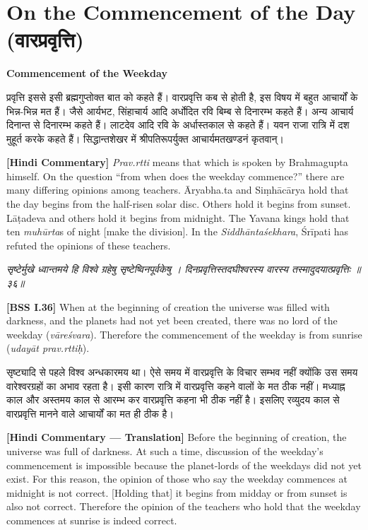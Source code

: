 \documentclass[11pt,a4paper]{book}
\newcommand{\dev}[1]{{\devanagarifont #1}}
\newcommand{\shlokabilingual}[2]{%
  \par\vspace{0.8em}%
  \noindent\begin{minipage}[t]{0.48\textwidth}
    \RaggedRight
    \dev{\textit{#1}}
  \end{minipage}%
  \hfill
  \begin{minipage}[t]{0.48\textwidth}
    \RaggedRight
    #2%
  \end{minipage}%
  \par\vspace{0.8em}%
}
\newcommand{\hindicommbilingual}[2]{%
  \par\vspace{0.5em}%
  \noindent\begin{minipage}[t]{0.48\textwidth}
    \RaggedRight\small
    \dev{#1}
  \end{minipage}%
  \hfill
  \begin{minipage}[t]{0.48\textwidth}
    \RaggedRight\small
    #2%
  \end{minipage}%
  \par\vspace{0.5em}%
}
\newcommand{\ruleheadingbilingual}[2]{%
  \par\vspace{0.8em}%
  \noindent\begin{minipage}[t]{0.48\textwidth}
    \textbf{\color{sectioncolor}\dev{#1}}
  \end{minipage}%
  \hfill
  \begin{minipage}[t]{0.48\textwidth}
    \textbf{\color{sectioncolor}#2}
  \end{minipage}%
  \par\vspace{0.4em}%
}
\begin{document}
\section{On the Commencement of the Day (\dev{वारप्रवृत्ति})}

\ruleheadingbilingual{प्रवृत्तिवाद}{Commencement of the Weekday}

\hindicommbilingual{%
\dev{प्रवृत्ति} इससे इसी ब्रह्मगुप्तोक्त बात को कहते हैं। वारप्रवृत्ति कब से होती है, इस विषय में बहुत आचार्यों के भिन्न-भिन्न मत हैं। जैसे आर्यभट, सिंहाचार्य आदि अर्धोदित रवि बिम्ब से दिनारम्भ कहते हैं। अन्य आचार्य दिनान्त से दिनारम्भ कहते हैं। लाटदेव आदि रवि के अर्धास्तकाल से कहते हैं। यवन राजा रात्रि में दश मुहूर्त करके कहते हैं। सिद्धान्तशेखर में श्रीपतिरूपर्युक्त आचार्यमतखण्डनं कृतवान्‌।
}{%
\textbf{[Hindi Commentary]} \textit{Prav.rtti} means that which is spoken by Brahmagupta himself. On the question ``from when does the weekday commence?'' there are many differing opinions among teachers. Āryabha.ta and Siṃhācārya hold that the day begins from the half-risen solar disc. Others hold it begins from sunset. Lāṭadeva and others hold it begins from midnight. The Yavana kings hold that ten \textit{muhūrta}s of night [make the division]. In the \textit{Siddhāntaśekhara}, Śrīpati has refuted the opinions of these teachers.
}

\shlokabilingual{%
सृष्टेर्मुखे ध्वान्तमये हि विश्वे ग्रहेषु सृष्टेष्विनपूर्वकेषु ।
दिनप्रवृत्तिस्तदघीश्वरस्य वारस्य तस्मादुदयात्प्रवृत्तिः ॥३६॥
}{%
\textbf{[BSS I.36]} When at the beginning of creation the universe was filled with darkness, and the planets had not yet been created, there was no lord of the weekday (\textit{vāreśvara}). Therefore the commencement of the weekday is from sunrise (\textit{udayāt prav.rttiḥ}).
}

\hindicommbilingual{%
सृष्ट्यादि से पहले विश्व अन्धकारमय था। ऐसे समय में वारप्रवृत्ति के विचार सम्भव नहीं क्योंकि उस समय वारेश्वरग्रहों का अभाव रहता है। इसी कारण रात्रि में वारप्रवृत्ति कहने वालों के मत ठीक नहीं। मध्याह्न काल और अस्तमय काल से आरम्भ कर वारप्रवृत्ति कहना भी ठीक नहीं है। इसलिए रव्युदय काल से वारप्रवृत्ति मानने वाले आचार्यों का मत ही ठीक है।
}{%
\textbf{[Hindi Commentary --- Translation]} Before the beginning of creation, the universe was full of darkness. At such a time, discussion of the weekday's commencement is impossible because the planet-lords of the weekdays did not yet exist. For this reason, the opinion of those who say the weekday commences at midnight is not correct. [Holding that] it begins from midday or from sunset is also not correct. Therefore the opinion of the teachers who hold that the weekday commences at sunrise is indeed correct.
}
\end{document}
